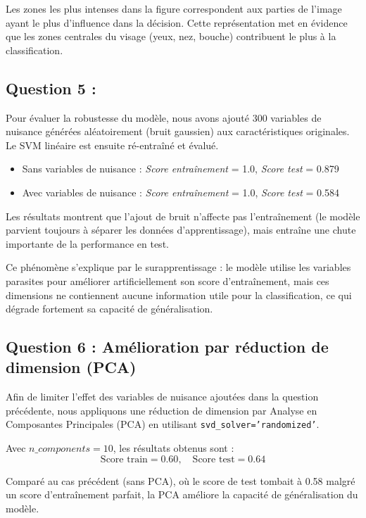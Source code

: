 \documentclass[12pt]{article}
\begin{document}
Les zones les plus intenses dans la figure correspondent aux parties de l’image ayant le plus d’influence dans la décision. Cette représentation met en évidence que les zones centrales du visage (yeux, nez, bouche) 
contribuent le plus à la classification.
\newpage
\subsection{Question 5 : }
Pour évaluer la robustesse du modèle, nous avons ajouté 300 variables de 
nuisance générées aléatoirement (bruit gaussien) aux caractéristiques originales. 
Le SVM linéaire est ensuite ré-entraîné et évalué.

\begin{itemize}
  \item Sans variables de nuisance : 
  \textit{Score entraînement} = 1.0, \textit{Score test} = 0.879
  \item Avec variables de nuisance : 
  \textit{Score entraînement} = 1.0, \textit{Score test} = 0.584
\end{itemize}

Les résultats montrent que l’ajout de bruit n’affecte pas l’entraînement 
(le modèle parvient toujours à séparer les données d’apprentissage), 
mais entraîne une chute importante de la performance en test. 

Ce phénomène s’explique par le surapprentissage : 
le modèle utilise les variables parasites pour améliorer artificiellement 
son score d’entraînement, mais ces dimensions ne contiennent aucune information 
utile pour la classification, ce qui dégrade fortement sa capacité de généralisation.

\subsection{Question 6 : Amélioration par réduction de dimension (PCA)}

Afin de limiter l’effet des variables de nuisance ajoutées dans la 
question précédente, nous appliquons une réduction de dimension 
par Analyse en Composantes Principales (PCA) en utilisant 
\texttt{svd\_solver='randomized'}.

Avec $n\_components = 10$, les résultats obtenus sont :
\[
\text{Score train} = 0.60, \quad \text{Score test} = 0.64
\]

Comparé au cas précédent (sans PCA), où le score de test tombait à 
0.58 malgré un score d’entraînement parfait, la PCA améliore la 
capacité de généralisation du modèle. 
\end{document}
